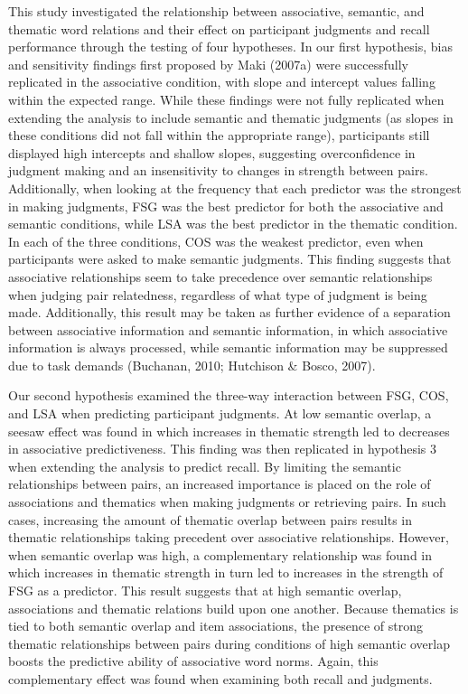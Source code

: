 \documentclass[english,man]{apa6}
\theoremstyle{definition}
\theoremstyle{definition}
\theoremstyle{remark}
\begin{document}
This study investigated the relationship between associative, semantic,
and thematic word relations and their effect on participant judgments
and recall performance through the testing of four hypotheses. In our
first hypothesis, bias and sensitivity findings first proposed by Maki
(2007a) were successfully replicated in the associative condition, with
slope and intercept values falling within the expected range. While
these findings were not fully replicated when extending the analysis to
include semantic and thematic judgments (as slopes in these conditions
did not fall within the appropriate range), participants still displayed
high intercepts and shallow slopes, suggesting overconfidence in
judgment making and an insensitivity to changes in strength between
pairs. Additionally, when looking at the frequency that each predictor
was the strongest in making judgments, FSG was the best predictor for
both the associative and semantic conditions, while LSA was the best
predictor in the thematic condition. In each of the three conditions,
COS was the weakest predictor, even when participants were asked to make
semantic judgments. This finding suggests that associative relationships
seem to take precedence over semantic relationships when judging pair
relatedness, regardless of what type of judgment is being made.
Additionally, this result may be taken as further evidence of a
separation between associative information and semantic information, in
which associative information is always processed, while semantic
information may be suppressed due to task demands (Buchanan, 2010;
Hutchison \& Bosco, 2007).

Our second hypothesis examined the three-way interaction between FSG,
COS, and LSA when predicting participant judgments. At low semantic
overlap, a seesaw effect was found in which increases in thematic
strength led to decreases in associative predictiveness. This finding
was then replicated in hypothesis 3 when extending the analysis to
predict recall. By limiting the semantic relationships between pairs, an
increased importance is placed on the role of associations and thematics
when making judgments or retrieving pairs. In such cases, increasing the
amount of thematic overlap between pairs results in thematic
relationships taking precedent over associative relationships. However,
when semantic overlap was high, a complementary relationship was found
in which increases in thematic strength in turn led to increases in the
strength of FSG as a predictor. This result suggests that at high
semantic overlap, associations and thematic relations build upon one
another. Because thematics is tied to both semantic overlap and item
associations, the presence of strong thematic relationships between
pairs during conditions of high semantic overlap boosts the predictive
ability of associative word norms. Again, this complementary effect was
found when examining both recall and judgments.
\end{document}
